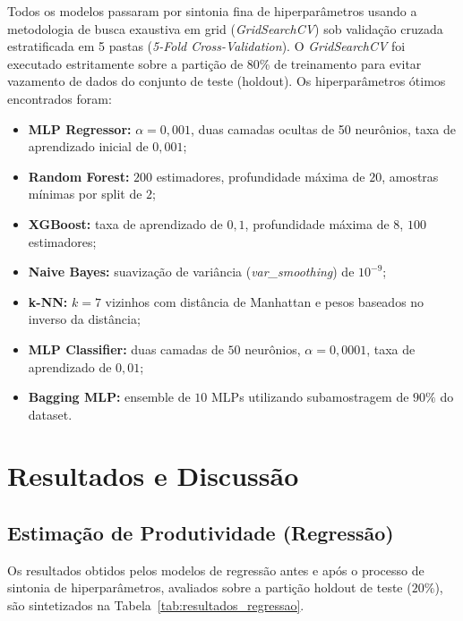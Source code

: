 \documentclass[conference]{IEEEtran}
\begin{document}
Todos os modelos passaram por sintonia fina de hiperparâmetros usando a metodologia de busca exaustiva em grid (\textit{GridSearchCV}) sob validação cruzada estratificada em 5 pastas (\textit{5-Fold Cross-Validation}). O \textit{GridSearchCV} foi executado estritamente sobre a partição de 80\% de treinamento para evitar vazamento de dados do conjunto de teste (holdout). Os hiperparâmetros ótimos encontrados foram:
\begin{itemize}
    \item \textbf{MLP Regressor:} $\alpha = 0{,}001$, duas camadas ocultas de 50 neurônios, taxa de aprendizado inicial de $0{,}001$;
    \item \textbf{Random Forest:} $200$ estimadores, profundidade máxima de $20$, amostras mínimas por split de $2$;
    \item \textbf{XGBoost:} taxa de aprendizado de $0{,}1$, profundidade máxima de $8$, $100$ estimadores;
    \item \textbf{Naive Bayes:} suavização de variância (\textit{var\_smoothing}) de $10^{-9}$;
    \item \textbf{k-NN:} $k = 7$ vizinhos com distância de Manhattan e pesos baseados no inverso da distância;
    \item \textbf{MLP Classifier:} duas camadas de $50$ neurônios, $\alpha = 0{,}0001$, taxa de aprendizado de $0{,}01$;
    \item \textbf{Bagging MLP:} ensemble de $10$ MLPs utilizando subamostragem de $90\%$ do dataset.
\end{itemize}

\section{Resultados e Discussão}

\subsection{Estimação de Produtividade (Regressão)}
Os resultados obtidos pelos modelos de regressão antes e após o processo de sintonia de hiperparâmetros, avaliados sobre a partição holdout de teste ($20\%$), são sintetizados na Tabela~\ref{tab:resultados_regressao}.
\end{document}
